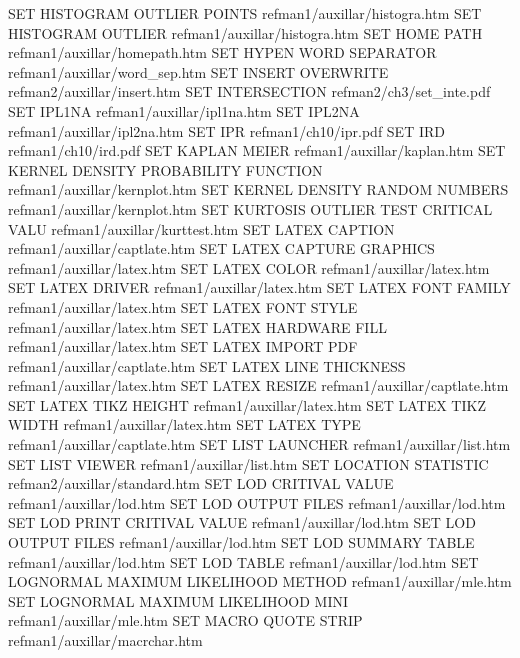 SET HISTOGRAM OUTLIER POINTS            refman1/auxillar/histogra.htm
SET HISTOGRAM OUTLIER                   refman1/auxillar/histogra.htm
SET HOME PATH                           refman1/auxillar/homepath.htm
SET HYPEN WORD SEPARATOR                refman1/auxillar/word_sep.htm
SET INSERT OVERWRITE                    refman2/auxillar/insert.htm
SET INTERSECTION                        refman2/ch3/set_inte.pdf
SET IPL1NA                              refman1/auxillar/ipl1na.htm
SET IPL2NA                              refman1/auxillar/ipl2na.htm
SET IPR                                 refman1/ch10/ipr.pdf
SET IRD                                 refman1/ch10/ird.pdf
SET KAPLAN MEIER                        refman1/auxillar/kaplan.htm
SET KERNEL DENSITY PROBABILITY FUNCTION refman1/auxillar/kernplot.htm
SET KERNEL DENSITY RANDOM NUMBERS       refman1/auxillar/kernplot.htm
SET KURTOSIS OUTLIER TEST CRITICAL VALU refman1/auxillar/kurttest.htm
SET LATEX CAPTION                       refman1/auxillar/captlate.htm
SET LATEX CAPTURE GRAPHICS              refman1/auxillar/latex.htm
SET LATEX COLOR                         refman1/auxillar/latex.htm
SET LATEX DRIVER                        refman1/auxillar/latex.htm
SET LATEX FONT FAMILY                   refman1/auxillar/latex.htm
SET LATEX FONT STYLE                    refman1/auxillar/latex.htm
SET LATEX HARDWARE FILL                 refman1/auxillar/latex.htm
SET LATEX IMPORT PDF                    refman1/auxillar/captlate.htm
SET LATEX LINE THICKNESS                refman1/auxillar/latex.htm
SET LATEX RESIZE                        refman1/auxillar/captlate.htm
SET LATEX TIKZ HEIGHT                   refman1/auxillar/latex.htm
SET LATEX TIKZ WIDTH                    refman1/auxillar/latex.htm
SET LATEX TYPE                          refman1/auxillar/captlate.htm
SET LIST LAUNCHER                       refman1/auxillar/list.htm
SET LIST VIEWER                         refman1/auxillar/list.htm
SET LOCATION STATISTIC                  refman2/auxillar/standard.htm
SET LOD CRITIVAL VALUE                  refman1/auxillar/lod.htm
SET LOD OUTPUT FILES                    refman1/auxillar/lod.htm
SET LOD PRINT CRITIVAL VALUE            refman1/auxillar/lod.htm
SET LOD OUTPUT FILES                    refman1/auxillar/lod.htm
SET LOD SUMMARY TABLE                   refman1/auxillar/lod.htm
SET LOD TABLE                           refman1/auxillar/lod.htm
SET LOGNORMAL MAXIMUM LIKELIHOOD METHOD refman1/auxillar/mle.htm
SET LOGNORMAL MAXIMUM LIKELIHOOD MINI   refman1/auxillar/mle.htm
SET MACRO QUOTE STRIP                   refman1/auxillar/macrchar.htm

